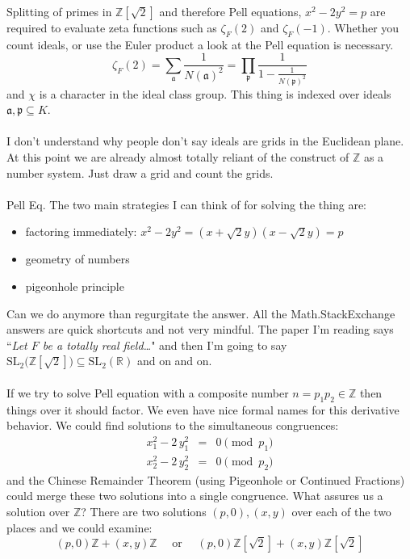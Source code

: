 \documentclass[12pt]{article}
\begin{document}
\noindent Splitting of primes in $\mathbb{Z}[\sqrt{2}]$ and therefore Pell equations, $x^2 - 2y^2 = p$ are required to evaluate zeta functions such as $\zeta_F(2)$ and $\zeta_F(-1)$.  Whether you count ideals, or use the Euler product a look at the Pell equation is necessary. 
$$ \zeta_F(2) = \sum_\mathfrak{a} \frac{1}{N(\mathfrak{a})^2} = \prod_\mathfrak{p} \frac{1}{1 - \frac{1}{N(\mathfrak{p})^2}}$$
and $\chi$ is a character in the ideal class group. This thing is indexed over ideals $\mathfrak{a}, \mathfrak{p} \subseteq K$.  \\ \\
I don't understand why people don't say ideals are grids in the Euclidean plane.  At this point we are already almost totally reliant of the construct of $\mathbb{Z}$ as a number system.  Just draw a grid and count the grids.  \\ \\
Pell Eq.  The two main strategies I can think of for solving the thing are:
\begin{itemize}
\item factoring immediately: $x^2 - 2y^2 = (x + \sqrt{2}y)(x - \sqrt{2}y) = p$ 
\item geometry of numbers
\item pigeonhole principle
\end{itemize}
Can we do anymore than regurgitate the answer.  All the Math.StackExchange answers are quick shortcuts and not very mindful.  The paper I'm reading says ``\textit{Let $F$ be a totally real field\dots}" and then I'm going to say $\text{SL}_2\big(\mathbb{Z}[\sqrt{2}]\big)\subseteq \text{SL}_2(\mathbb{R})$ and  on and on. \\ \\
If we try to solve Pell equation with a composite number $n = p_1 p_2 \in \mathbb{Z}$ then things over it should factor.  We even have nice formal names for this derivative behavior.  We could find solutions to the simultaneous congruences:
\begin{eqnarray*}
x_1^2 - 2\,y_1^2 &=& 0 \pmod {p_1} \\ 
x_2^2 - 2\,y_2^2 &=& 0 \pmod {p_2} 
\end{eqnarray*} 
and the Chinese Remainder Theorem (using Pigeonhole or Continued Fractions) could merge these two solutions into a single congruence.  What assures us a solution over $\mathbb{Z}$?  There are two solutions $(p,0), (x,y)$ over each of the two places and we could examine:
$$ (p,0)\mathbb{Z} + (x,y) \mathbb{Z} \quad\text{ or }\quad
(p,0)\mathbb{Z}[\sqrt{2}] + (x,y) \mathbb{Z}[\sqrt{2}] $$
\end{document}
